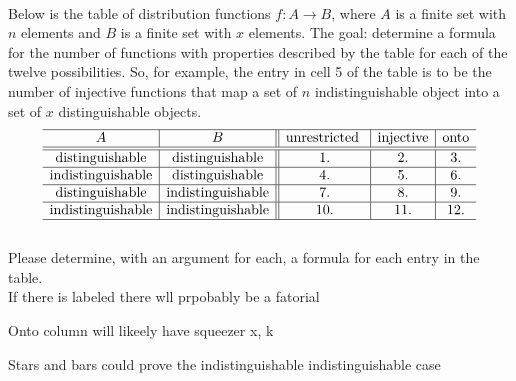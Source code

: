 \documentclass[10pt, AMS Euler]{article}
\begin{document}
	\noindent \maltese \hspace{1ex}{\bf Sub-Experience Three: The Master Table of Distributions.} \\
	
	\noindent Below is the table of distribution functions $f:A \to B$, where
$A$ is a finite set with $n$ elements and $B$ is a finite set with $x$ elements.
The goal: determine a formula for the number of functions with properties
described by the table for each of the twelve possibilities.
So, for example, the entry in cell 5 of the table is to be the number of
injective functions that map a set of $n$ indistinguishable object into a set of
$x$ distinguishable objects.
$$\begin{array}{c|c||c|c|c}
\hline A & B & \mbox{unrestricted }& \mbox{injective}& \mbox{onto} \\
\hline \hline
\mbox{distinguishable} & \mbox{distinguishable} & 1. & 2. & 3. \\
\hline
\mbox{indistinguishable}& \mbox{distinguishable}&4.&5.&6. \\ \hline
\mbox{distinguishable} & \mbox{indistinguishable}& 7. & 8. & 9. \\
\hline
\mbox{indistinguishable}&\mbox{indistinguishable}& 10. &11.&12. \\
\hline \end{array}$$\\


			\noindent Please determine, with an argument for each, a formula for each entry in the table.\\


		If there is labeled there wll prpobably be a fatorial

		Onto column will likeely have squeezer {x, k}

		Stars and bars could prove the indistinguishable indistinguishable case
\end{document}
